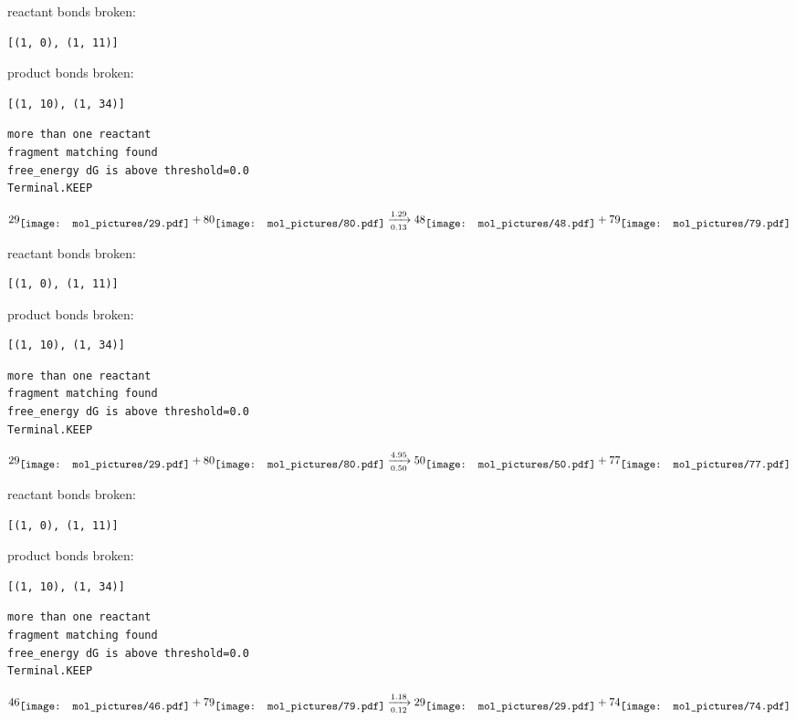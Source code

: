 \documentclass{article}
\begin{document}
reactant bonds broken:\begin{verbatim}
[(1, 0), (1, 11)]
\end{verbatim}
product bonds broken:\begin{verbatim}
[(1, 10), (1, 34)]
\end{verbatim}




\vspace{1cm}
\begin{verbatim}
more than one reactant
fragment matching found
free_energy dG is above threshold=0.0
Terminal.KEEP
\end{verbatim}
$$
29
\raisebox{-.5\height}{\texttt{[image: mol\_pictures/29.pdf]}}
+
80
\raisebox{-.5\height}{\texttt{[image: mol\_pictures/80.pdf]}}
\xrightarrow[0.13]{1.29}
48
\raisebox{-.5\height}{\texttt{[image: mol\_pictures/48.pdf]}}
+
79
\raisebox{-.5\height}{\texttt{[image: mol\_pictures/79.pdf]}}
$$


reactant bonds broken:\begin{verbatim}
[(1, 0), (1, 11)]
\end{verbatim}
product bonds broken:\begin{verbatim}
[(1, 10), (1, 34)]
\end{verbatim}




\vspace{1cm}
\begin{verbatim}
more than one reactant
fragment matching found
free_energy dG is above threshold=0.0
Terminal.KEEP
\end{verbatim}
$$
29
\raisebox{-.5\height}{\texttt{[image: mol\_pictures/29.pdf]}}
+
80
\raisebox{-.5\height}{\texttt{[image: mol\_pictures/80.pdf]}}
\xrightarrow[0.50]{4.95}
50
\raisebox{-.5\height}{\texttt{[image: mol\_pictures/50.pdf]}}
+
77
\raisebox{-.5\height}{\texttt{[image: mol\_pictures/77.pdf]}}
$$


reactant bonds broken:\begin{verbatim}
[(1, 0), (1, 11)]
\end{verbatim}
product bonds broken:\begin{verbatim}
[(1, 10), (1, 34)]
\end{verbatim}




\vspace{1cm}
\begin{verbatim}
more than one reactant
fragment matching found
free_energy dG is above threshold=0.0
Terminal.KEEP
\end{verbatim}
$$
46
\raisebox{-.5\height}{\texttt{[image: mol\_pictures/46.pdf]}}
+
79
\raisebox{-.5\height}{\texttt{[image: mol\_pictures/79.pdf]}}
\xrightarrow[0.12]{1.18}
29
\raisebox{-.5\height}{\texttt{[image: mol\_pictures/29.pdf]}}
+
74
\raisebox{-.5\height}{\texttt{[image: mol\_pictures/74.pdf]}}
$$
\end{document}
